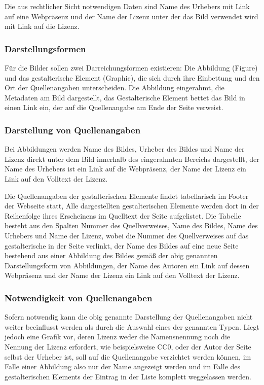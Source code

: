 Die aus rechtlicher Sicht notwendigen Daten sind Name des Urhebers mit Link auf
eine Webpräsenz und der Name der Lizenz unter der das Bild verwendet wird
mit Link auf die Lizenz.

\subsubsection{Darstellungsformen}

Für die Bilder sollen zwei Darreichungsformen existieren: Die Abbildung
(Figure) und das gestalterische Element (Graphic), die sich durch ihre
Einbettung und den Ort der Quellenangaben unterscheiden. Die Abbildung
eingerahmt, die Metadaten am Bild dargestellt, das Gestalterische Element bettet
das Bild in einen Link ein, der auf die Quellenangabe am Ende der Seite verweist.

\subsubsection{Darstellung von Quellenangaben}

Bei Abbildungen werden Name des Bildes, Urheber des Bildes und Name der Lizenz
direkt unter dem Bild innerhalb des eingerahmten Bereichs dargestellt, der Name
des Urhebers ist ein Link auf die Webpräsenz, der Name der Lizenz ein Link
auf den Volltext der Lizenz.

Die Quellenangaben der gestalterischen Elemente findet tabellarisch im Footer der
Webseite statt, Alle dargestellten gestalterischen Elemente werden dort in der
Reihenfolge ihres Erscheinens im Quelltext der Seite aufgelistet. Die Tabelle
besteht aus den Spalten Nummer des Quellverweises, Name des Bildes,
Name des Urhebers und Name der Lizenz, wobei die Nummer des Quellverweises auf
das gestalterische in der Seite verlinkt, der Name des Bildes auf eine neue
Seite bestehend aus einer Abbildung des Bildes gemäß der obig genannten
Darstellungsform von Abbildungen, der Name des Autoren ein Link auf dessen
Webpräsenz und der Name der Lizenz ein Link auf den Volltext der Lizenz.

\subsubsection{Notwendigkeit von Quellenangaben}

Sofern notwendig kann die obig genannte Darstellung der Quellenangaben nicht
weiter beeinflusst werden als durch die Auswahl eines der genannten Typen. Liegt
jedoch eine Grafik vor, deren Lizenz weder die Namensnennung noch die Nennung
der Lizenz erfordert, wie beispielsweise CC0, oder der Autor der Seite selbst der
Urheber ist, soll auf die Quellenangabe verzichtet werden können, im Falle
einer Abbildung also nur der Name angezeigt werden und im Falle des
gestalterischen Elements der Eintrag in der Liste komplett weggelassen werden.

